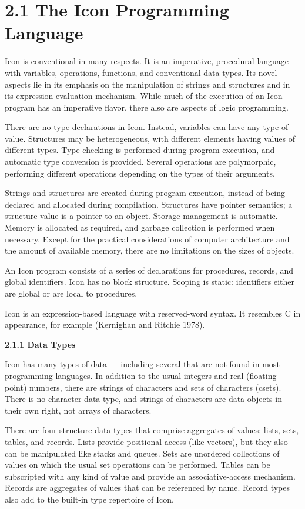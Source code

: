 \section[2.1 The Icon Programming Language]{2.1 The Icon Programming Language}

Icon is conventional in many respects. It is an imperative, procedural
language with variables, operations, functions, and conventional data
types. Its novel aspects lie in its emphasis on the manipulation of
strings and structures and in its expression-evaluation
mechanism. While much of the execution of an Icon program has an
imperative flavor, there also are aspects of logic programming.

There are no type declarations in Icon. Instead, variables can have
any type of value. Structures may be heterogeneous, with different
elements having values of different types. Type checking is performed
during program execution, and automatic type conversion is
provided. Several operations are polymorphic, performing different
operations depending on the types of their arguments.

Strings and structures are created during program execution, instead
of being declared and allocated during compilation.  Structures have
pointer semantics; a structure value is a pointer to an object.
Storage management is automatic. Memory is allocated as required, and
garbage collection is performed when necessary. Except for the
practical considerations of computer architecture and the amount of
available memory, there are no limitations on the sizes of objects.

An Icon program consists of a series of declarations for procedures,
records, and global identifiers. Icon has no block structure. Scoping
is static: identifiers either are global or are local to procedures.

Icon is an expression-based language with reserved-word syntax. It
resembles C in appearance, for example (Kernighan and Ritchie 1978).

{\sffamily\bfseries
2.1.1 Data Types}

Icon has many types of data --- including several that are not found in
most programming languages. In addition to the usual integers and real
(floating-point) numbers, there are strings of characters and sets of
characters (csets). There is no character data type, and strings of
characters are data objects in their own right, not arrays of
characters.

There are four structure data types that comprise aggregates of
values: lists, sets, tables, and records. Lists provide positional
access (like vectors), but they also can be manipulated like stacks
and queues. Sets are unordered collections of values on which the
usual set operations can be performed. Tables can be subscripted with
any kind of value and provide an associative-access mechanism. Records
are aggregates of values that can be referenced by name.  Record types
also add to the built-in type repertoire of Icon.

